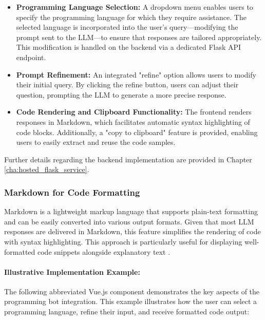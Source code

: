 \begin{itemize}
  \item \textbf{Programming Language Selection:} A dropdown menu enables users to specify the programming language for which they require assistance. The selected language is incorporated into the user’s query—modifying the prompt sent to the LLM—to ensure that responses are tailored appropriately. This modification is handled on the backend via a dedicated Flask API endpoint.
  
  \item \textbf{Prompt Refinement:} An integrated "refine" option allows users to modify their initial query. By clicking the refine button, users can adjust their question, prompting the LLM to generate a more precise response.
  
  \item \textbf{Code Rendering and Clipboard Functionality:} The frontend renders responses in Markdown, which facilitates automatic syntax highlighting of code blocks. Additionally, a "copy to clipboard" feature is provided, enabling users to easily extract and reuse the code samples.
\end{itemize}

Further details regarding the backend implementation are provided in Chapter \ref{cha:hosted_flask_service}.

\subsubsection{Markdown for Code Formatting}

Markdown is a lightweight markup language that supports plain-text formatting and can be easily converted into various output formats. Given that most LLM responses are delivered in Markdown, this feature simplifies the rendering of code with syntax highlighting. This approach is particularly useful for displaying well-formatted code snippets alongside explanatory text \cite{What-Is-Markdown}.

\paragraph{Illustrative Implementation Example:}

The following abbreviated Vue.js component demonstrates the key aspects of the programming bot integration. This example illustrates how the user can select a programming language, refine their input, and receive formatted code output:

